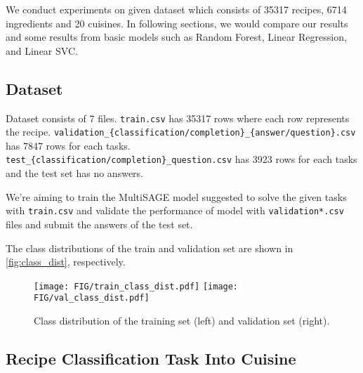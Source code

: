 

 We conduct experiments on given dataset which consists of 35317 recipes, 6714 ingredients and 20 cuisines. In following sections, we would compare our results and some results from basic models such as Random Forest, Linear Regression, and Linear SVC.
 
 \subsection{Dataset}
 Dataset consists of 7 files. \texttt{train.csv} has 35317 rows where each row represents the recipe. \texttt{validation\_\texttt{\{classification/completion\}}\_\texttt{\{answer/question\}}.csv} has 7847 rows for each tasks. \texttt{test\_\texttt{\{classification/completion\}}\_question.csv} has 3923 rows for each tasks and the test set has no answers.  
 
  We're aiming to train the MultiSAGE model suggested to solve the given tasks with \texttt{train.csv} and validate the performance of model with \texttt{validation*.csv} files and submit the answers of the test set.

  The class distributions of the train and validation set are shown in  \autoref{fig:class_dist}, respectively.

  \begin{figure}
      \texttt{[image: FIG/train\_class\_dist.pdf]}
      \texttt{[image: FIG/val\_class\_dist.pdf]}
      \caption{\label{fig:class_dist} Class distribution of the training set (left) and validation set (right).}
  \end{figure}

 \subsection{Recipe Classification Task Into Cuisine}

 \begin{table}[btp!]
    \centering
    \caption{\label{tab:classification_task_result} Performance measured by \{Micro/Macro\} F1-score and accuracy of each model in validation classification set.}

 \end{table}
 
